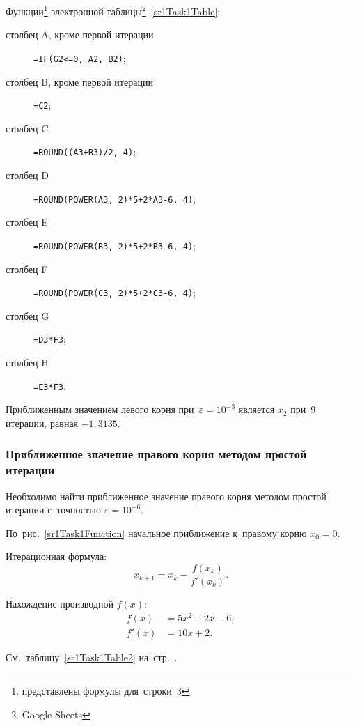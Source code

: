 \documentclass[10pt, a4paper, titlepage, oneside]{article}
\begin{document}
Функции\footnote{представлены формулы для~строки~3} электронной таблицы\footnote{Google Sheets}~\ref{sr1Task1Table}:
\begin{description}
    \item[столбец A, кроме первой итерации] \verb"=IF(G2<=0, A2, B2)";
    
    \item[столбец B, кроме первой итерации] \verb"=C2";
    
    \item[столбец C] \verb"=ROUND((A3+B3)/2, 4)";
    
    \item[столбец D] \verb"=ROUND(POWER(A3, 2)*5+2*A3-6, 4)";
    
    \item[столбец E] \verb"=ROUND(POWER(B3, 2)*5+2*B3-6, 4)";
    
    \item[столбец F] \verb"=ROUND(POWER(C3, 2)*5+2*C3-6, 4)";
    
    \item[столбец G] \verb"=D3*F3";
    
    \item[столбец H] \verb"=E3*F3".

\end{description}

Приближенным значением левого корня при~$\varepsilon=10^{-3}$ является $x_2$ при~$9$ итерации, равная $-1,3135$.

\subsubsection*{Приближенное значение правого корня методом простой итерации}

Необходимо найти приближенное значение правого корня методом простой итерации с~точностью $\varepsilon=10^{-6}$.

По~рис.~\ref{sr1Task1Function} начальное приближение к~правому корню $x_0=0$.

Итерационная формула: $$x_{k+1}=x_k-\frac{f(x_k)}{f'(x_k)} .$$

Нахождение производной $f(x)$:
\begin{align*}
    f(x) &= 5x^2+2x-6, \\
    f'(x) &= 10x+2.
\end{align*}

См.~таблицу~\ref{sr1Task1Table2} на~стр.~\pageref{sr1Task1Table2}.
\end{document}
